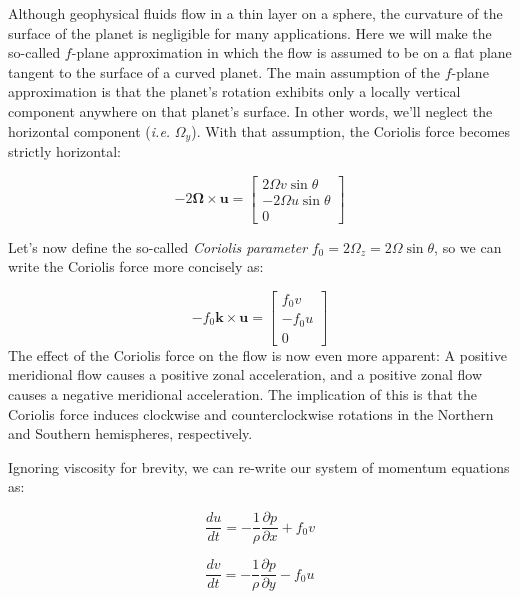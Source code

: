 \documentclass[12pt]{article}
\numberwithin{equation}{section}
\numberwithin{figure}{section}
\numberwithin{table}{section}
\begin{document}
Although geophysical fluids flow in a thin layer on a sphere, the curvature of
the surface of the planet is negligible for many applications.
Here we will make the so-called $f$-plane approximation in which the flow is
assumed to be on a flat plane tangent to the surface of a curved planet.
The main assumption of the $f$-plane approximation is that the planet's rotation
exhibits only a locally vertical component anywhere on that planet's surface.
In other words, we'll neglect the horizontal component (\textit{i.e.} $\Omega_y$).
With that assumption, the Coriolis force becomes strictly horizontal:

\begin{equation}
  - 2 \mathbf{\Omega} \times \mathbf{u} =
  \begin{bmatrix}
    2 \Omega v \sin\theta \\
    - 2 \Omega u \sin\theta \\
    0
  \end{bmatrix}
\end{equation}

Let's now define the so-called \textit{Coriolis parameter}
$f_0 = 2 \Omega_z = 2 \Omega \sin\theta$, so we can write the Coriolis force
more concisely as:

\begin{equation}
  - f_0 \mathbf{k} \times \mathbf{u} =
  \begin{bmatrix}
    f_0 v \\
    - f_0 u \\
    0
  \end{bmatrix}
\end{equation}
The effect of the Coriolis force on the flow is now even more apparent:
A positive meridional flow causes a positive zonal acceleration,
and a positive zonal flow causes a negative meridional acceleration.
The implication of this is that the Coriolis force induces clockwise and
counterclockwise rotations in the Northern and Southern hemispheres,
respectively.

Ignoring viscosity for brevity, we can re-write our system of momentum equations as:

\begin{equation}
  \frac{du}{dt} = - \frac{1}{\rho} \frac{\partial p}{\partial x} + f_0 v
\end{equation}

\begin{equation}
  \frac{dv}{dt} = - \frac{1}{\rho} \frac{\partial p}{\partial y} - f_0 u
\end{equation}
\end{document}
